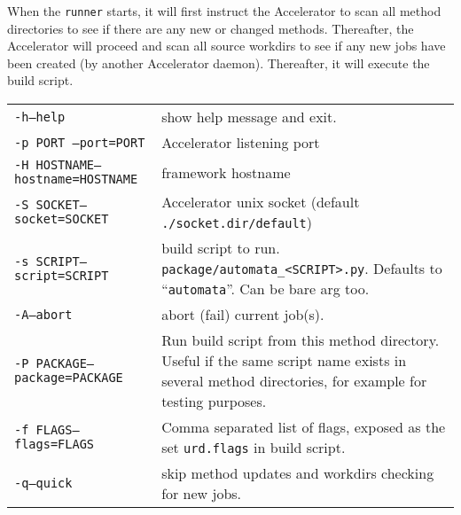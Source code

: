 When the \texttt{runner} starts, it will first instruct the
Accelerator to scan all method directories to see if there are any new
or changed methods.  Thereafter, the Accelerator will proceed and scan
all source workdirs to see if any new jobs have been created (by
another Accelerator daemon).  Thereafter, it will execute the build
script.

\begin{snugshade}
\begin{tabular}{p{4cm}p{9cm}}
  \texttt{-h}\hspace{3cm}\texttt{---help} & show help message and
  exit.\\[4ex]

  \texttt{-p PORT }\hspace{3cm}\texttt{---port=PORT} & Accelerator
  listening port\\[4ex]

  \texttt{-H HOSTNAME}\hspace{3cm}\texttt{---hostname=HOSTNAME} &
  framework hostname\\[4ex]
  
  \texttt{-S SOCKET}\hspace{3cm}\texttt{---socket=SOCKET} &
  Accelerator unix socket (default
  \texttt{./socket.dir/default})\\[4ex]

  \texttt{-s SCRIPT}\hspace{1cm}\texttt{---script=SCRIPT} & build
  script to run. \texttt{package/automata\_<SCRIPT>.py}.  Defaults to
  ``\texttt{automata}''.  Can be bare arg too.\\[2ex]

  \texttt{-A}\hspace{3cm}\texttt{---abort} & abort (fail) current
  job(s).\\[4ex]

  \texttt{-P PACKAGE}\hspace{3cm}\texttt{---package=PACKAGE} & Run
  build script from this method directory.  Useful if the same script
  name exists in several method directories, for example for testing
  purposes.\\[2ex]

  \texttt{-f FLAGS}\hspace{3cm}\texttt{---flags=FLAGS} & Comma
  separated list of flags, exposed as the set \texttt{urd.flags} in
  build script.\\[2ex]
  
  \texttt{-q}\hspace{3cm}\texttt{---quick} & skip method updates and
  workdirs checking for new jobs.\\[4ex]


\end{tabular}
\end{snugshade}
